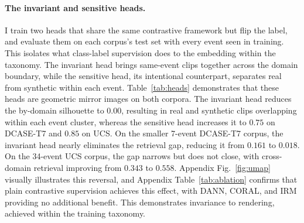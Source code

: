 \documentclass{article}
\begin{document}
\paragraph{The invariant and sensitive heads.} I train two heads that share the same contrastive framework but flip the label, and evaluate them on each corpus's test set with every event seen in training. This isolates what class-label supervision does to the embedding within the taxonomy. The invariant head brings same-event clips together across the domain boundary, while the sensitive head, its intentional counterpart, separates real from synthetic within each event. Table~\ref{tab:heads} demonstrates that these heads are geometric mirror images on both corpora. The invariant head reduces the by-domain silhouette to $0.00$, resulting in real and synthetic clips overlapping within each event cluster, whereas the sensitive head increases it to $0.75$ on DCASE-T7 and $0.85$ on UCS. On the smaller 7-event DCASE-T7 corpus, the invariant head nearly eliminates the retrieval gap, reducing it from $0.161$ to $0.018$. On the 34-event UCS corpus, the gap narrows but does not close, with cross-domain retrieval improving from $0.343$ to $0.558$. Appendix Fig.~\ref{fig:umap} visually illustrates this reversal, and Appendix Table~\ref{tab:ablation} confirms that plain contrastive supervision achieves this effect, with DANN, CORAL, and IRM providing no additional benefit. This demonstrates invariance to rendering, achieved within the training taxonomy.
\end{document}
